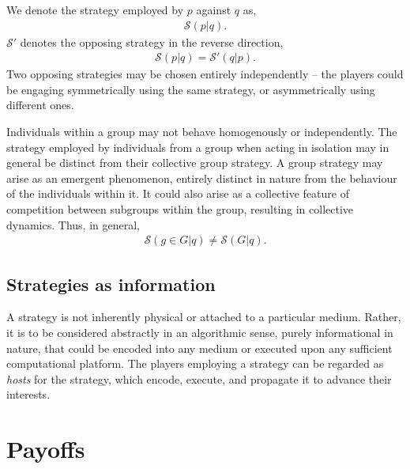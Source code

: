 \documentclass[twocolumn, aps, rmp, amsmath, amssymb, nofootinbib, superscriptaddress, longbibliography, floatfix, table-of-contents, eqsecnum]{revtex4-1}
\begin{document}
We denote the strategy employed by $p$ against $q$ as,
\begin{align}
	\mathcal{S}(p|q).	
\end{align}
$\mathcal{S}'$ denotes the opposing strategy in the reverse direction,
\begin{align}
	\mathcal{S}(p|q) = \mathcal{S}'(q|p).
\end{align}
Two opposing strategies may be chosen entirely independently -- the players could be engaging symmetrically using the same strategy, or asymmetrically using different ones.


Individuals within a group may not behave homogenously or independently. The strategy employed by individuals from a group when acting in isolation may in general be distinct from their collective group strategy. A group strategy may arise as an emergent phenomenon, entirely distinct in nature from the behaviour of the individuals within it. It could also arise as a collective feature of competition between subgroups within the group, resulting in collective dynamics. Thus, in general,
\begin{align}
	\mathcal{S}(g\in G|q)\neq \mathcal{S}(G|q).
\end{align}

\subsection{Strategies as information}

A strategy is not inherently physical or attached to a particular medium. Rather, it is to be considered abstractly in an algorithmic sense, purely informational in nature, that could be encoded into any medium or executed upon any sufficient computational platform. The players employing a strategy can be regarded as \textit{hosts} for the strategy, which encode, execute, and propagate it to advance their interests.


\section{Payoffs}
\end{document}
